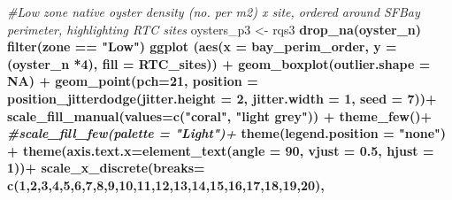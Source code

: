 \documentclass[
]{article}
\newenvironment{Shaded}{\begin{snugshade}}{\end{snugshade}}
\newcommand{\CommentTok}[1]{\textcolor[rgb]{0.56,0.35,0.01}{\textit{#1}}}
\newcommand{\DataTypeTok}[1]{\textcolor[rgb]{0.13,0.29,0.53}{#1}}
\newcommand{\DecValTok}[1]{\textcolor[rgb]{0.00,0.00,0.81}{#1}}
\newcommand{\FloatTok}[1]{\textcolor[rgb]{0.00,0.00,0.81}{#1}}
\newcommand{\KeywordTok}[1]{\textcolor[rgb]{0.13,0.29,0.53}{\textbf{#1}}}
\newcommand{\NormalTok}[1]{#1}
\newcommand{\OperatorTok}[1]{\textcolor[rgb]{0.81,0.36,0.00}{\textbf{#1}}}
\newcommand{\OtherTok}[1]{\textcolor[rgb]{0.56,0.35,0.01}{#1}}
\newcommand{\StringTok}[1]{\textcolor[rgb]{0.31,0.60,0.02}{#1}}
\begin{document}
\begin{Shaded}
\begin{Highlighting}[]
\CommentTok{#Low zone native oyster density (no. per m2) x site, ordered around SFBay perimeter, highlighting RTC sites}
\NormalTok{oysters_p3 <-}\StringTok{ }\NormalTok{rqs3 }\OperatorTok{%>%}
\StringTok{  }\KeywordTok{drop_na}\NormalTok{(oyster_n) }\OperatorTok{%>%}\StringTok{ }
\StringTok{  }\KeywordTok{filter}\NormalTok{(zone }\OperatorTok{==}\StringTok{ "Low"}\NormalTok{) }\OperatorTok{%>%}\StringTok{ }
\StringTok{  }\KeywordTok{ggplot}\NormalTok{ (}\KeywordTok{aes}\NormalTok{(}\DataTypeTok{x =}\NormalTok{ bay_perim_order, }\DataTypeTok{y =}\NormalTok{ (oyster_n }\OperatorTok{*}\DecValTok{4}\NormalTok{), }\DataTypeTok{fill =}\NormalTok{ RTC_sites)) }\OperatorTok{+}
\StringTok{  }\KeywordTok{geom_boxplot}\NormalTok{(}\DataTypeTok{outlier.shape =} \OtherTok{NA}\NormalTok{) }\OperatorTok{+}
\StringTok{  }\KeywordTok{geom_point}\NormalTok{(}\DataTypeTok{pch=}\DecValTok{21}\NormalTok{, }\DataTypeTok{position =} \KeywordTok{position_jitterdodge}\NormalTok{(}\DataTypeTok{jitter.height =} \DecValTok{2}\NormalTok{, }\DataTypeTok{jitter.width =} \DecValTok{1}\NormalTok{, }\DataTypeTok{seed =} \DecValTok{7}\NormalTok{))}\OperatorTok{+}
\StringTok{  }\KeywordTok{scale_fill_manual}\NormalTok{(}\DataTypeTok{values=}\KeywordTok{c}\NormalTok{(}\StringTok{"coral"}\NormalTok{, }\StringTok{"light grey"}\NormalTok{)) }\OperatorTok{+}
\StringTok{  }\KeywordTok{theme_few}\NormalTok{()}\OperatorTok{+}
\StringTok{  }\CommentTok{#scale_fill_few(palette = "Light")+}
\StringTok{  }\KeywordTok{theme}\NormalTok{(}\DataTypeTok{legend.position =} \StringTok{"none"}\NormalTok{) }\OperatorTok{+}
\StringTok{  }\KeywordTok{theme}\NormalTok{(}\DataTypeTok{axis.text.x=}\KeywordTok{element_text}\NormalTok{(}\DataTypeTok{angle =} \DecValTok{90}\NormalTok{, }\DataTypeTok{vjust =} \FloatTok{0.5}\NormalTok{, }\DataTypeTok{hjust =} \DecValTok{1}\NormalTok{))}\OperatorTok{+}
\StringTok{  }\KeywordTok{scale_x_discrete}\NormalTok{(}\DataTypeTok{breaks=} \KeywordTok{c}\NormalTok{(}\DecValTok{1}\NormalTok{,}\DecValTok{2}\NormalTok{,}\DecValTok{3}\NormalTok{,}\DecValTok{4}\NormalTok{,}\DecValTok{5}\NormalTok{,}\DecValTok{6}\NormalTok{,}\DecValTok{7}\NormalTok{,}\DecValTok{8}\NormalTok{,}\DecValTok{9}\NormalTok{,}\DecValTok{10}\NormalTok{,}\DecValTok{11}\NormalTok{,}\DecValTok{12}\NormalTok{,}\DecValTok{13}\NormalTok{,}\DecValTok{14}\NormalTok{,}\DecValTok{15}\NormalTok{,}\DecValTok{16}\NormalTok{,}\DecValTok{17}\NormalTok{,}\DecValTok{18}\NormalTok{,}\DecValTok{19}\NormalTok{,}\DecValTok{20}\NormalTok{), }
}}}
\end{Highlighting}
\end{Shaded}
\end{document}

